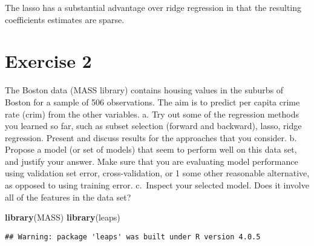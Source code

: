 \documentclass[
]{article}
\newenvironment{Shaded}{\begin{snugshade}}{\end{snugshade}}
\newcommand{\KeywordTok}[1]{\textcolor[rgb]{0.13,0.29,0.53}{\textbf{#1}}}
\newcommand{\NormalTok}[1]{#1}
\begin{document}
The lasso has a substantial advantage over ridge regression in that the
resulting coefficients estimates are sparse.

\hypertarget{exercise-2}{%
\section{Exercise 2}\label{exercise-2}}

The Boston data (MASS library) contains housing values in the suburbs of
Boston for a sample of 506 observations. The aim is to predict per
capita crime rate (crim) from the other variables. a. Try out some of
the regression methods you learned so far, such as subset selection
(forward and backward), lasso, ridge regression. Present and discuss
results for the approaches that you consider. b. Propose a model (or set
of models) that seem to perform well on this data set, and justify your
answer. Make sure that you are evaluating model performance using
validation set error, cross-validation, or 1 some other reasonable
alternative, as opposed to using training error. c.~Inspect your
selected model. Does it involve all of the features in the data set?

\begin{Shaded}
\begin{Highlighting}[]
\KeywordTok{library}\NormalTok{(MASS)}
\KeywordTok{library}\NormalTok{(leaps)}
\end{Highlighting}
\end{Shaded}

\begin{verbatim}
## Warning: package 'leaps' was built under R version 4.0.5
\end{verbatim}
\end{document}
